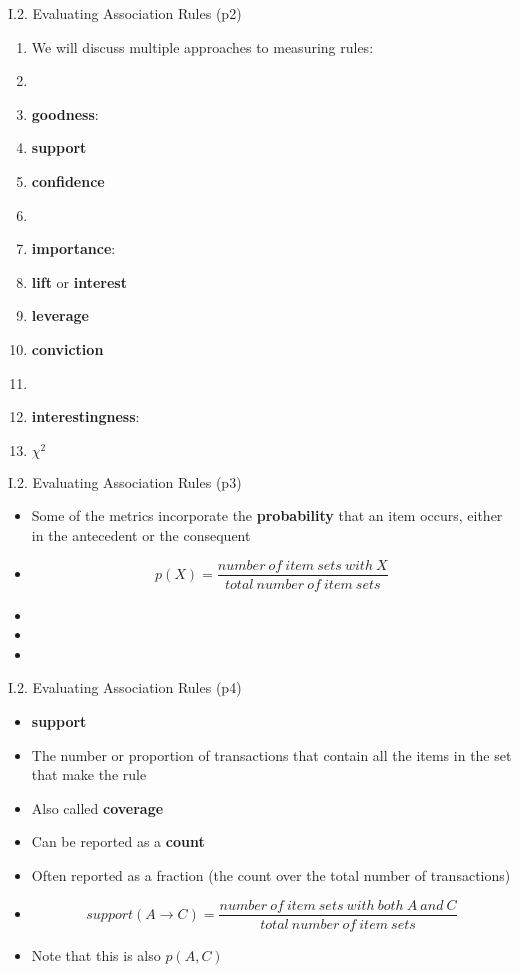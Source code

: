 \documentclass[handout]{beamer}
\newcommand{\strong}[1]{\textbf{\color{teal} #1}}
\newcommand{\stronger}[1]{\textbf{\color{purple} #1}}
\begin{document}
\begin{frame}{I.2. Evaluating Association Rules (p2)}
\begin{enumerate}
\item[] We will discuss multiple approaches to measuring rules:
\item[]
\item[] \strong{goodness}:
\item \stronger{support}
\item \stronger{confidence}
\item[]
\item[] \strong{importance}:
\item \stronger{lift} or \stronger{interest}
\item \stronger{leverage}
\item \stronger{conviction}
\item[]
\item[] \strong{interestingness}:
\item \stronger{$\chi^2$}
\end{enumerate}
\end{frame}
\begin{frame}{I.2. Evaluating Association Rules (p3)}
\begin{itemize}
\item Some of the metrics incorporate the \stronger{probability} that an item occurs, either in the antecedent or the consequent
\item[]
\[
	p( X ) =
	\frac{ \mathit{ number~of~item~sets~with~X }}
	     { \mathit{ total~number~of~item~sets }}
\]
\item[]
\item[]
\item[]

\end{itemize}
\end{frame}
\begin{frame}{I.2. Evaluating Association Rules (p4)}
\begin{itemize}
\item[] \stronger{support}
\item The number or proportion of transactions that contain all the items in the set that make the rule
\item Also called \stronger{coverage}
\item Can be reported as a \stronger{count}
\item Often reported as a fraction (the count over the total number of transactions)
\item[]
\[
	support( A \rightarrow C ) = 
	\frac{ \mathit{ number~of~item~sets~with~both~A~and~C }}
	     { \mathit{ total~number~of~item~sets }}
\]
\item Note that this is also $p(A,C)$
\end{itemize}
\end{frame}
\end{document}
